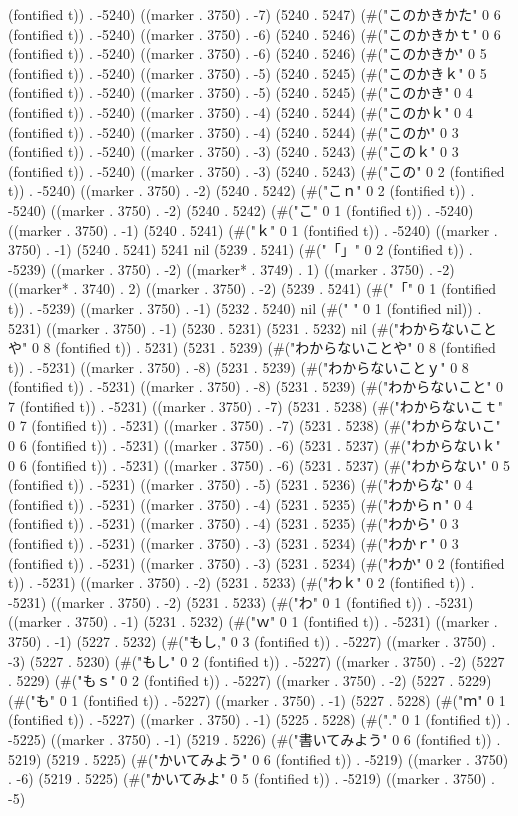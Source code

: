 {{(fontified t)) . -5240) ((marker . 3750) . -7) (5240 . 5247) (#("このかきかた" 0 6 (fontified t)) . -5240) ((marker . 3750) . -6) (5240 . 5246) (#("このかきかｔ" 0 6 (fontified t)) . -5240) ((marker . 3750) . -6) (5240 . 5246) (#("このかきか" 0 5 (fontified t)) . -5240) ((marker . 3750) . -5) (5240 . 5245) (#("このかきｋ" 0 5 (fontified t)) . -5240) ((marker . 3750) . -5) (5240 . 5245) (#("このかき" 0 4 (fontified t)) . -5240) ((marker . 3750) . -4) (5240 . 5244) (#("このかｋ" 0 4 (fontified t)) . -5240) ((marker . 3750) . -4) (5240 . 5244) (#("このか" 0 3 (fontified t)) . -5240) ((marker . 3750) . -3) (5240 . 5243) (#("このｋ" 0 3 (fontified t)) . -5240) ((marker . 3750) . -3) (5240 . 5243) (#("この" 0 2 (fontified t)) . -5240) ((marker . 3750) . -2) (5240 . 5242) (#("こｎ" 0 2 (fontified t)) . -5240) ((marker . 3750) . -2) (5240 . 5242) (#("こ" 0 1 (fontified t)) . -5240) ((marker . 3750) . -1) (5240 . 5241) (#("ｋ" 0 1 (fontified t)) . -5240) ((marker . 3750) . -1) (5240 . 5241) 5241 nil (5239 . 5241) (#("「」" 0 2 (fontified t)) . -5239) ((marker . 3750) . -2) ((marker* . 3749) . 1) ((marker . 3750) . -2) ((marker* . 3740) . 2) ((marker . 3750) . -2) (5239 . 5241) (#("「" 0 1 (fontified t)) . -5239) ((marker . 3750) . -1) (5232 . 5240) nil (#(" " 0 1 (fontified nil)) . 5231) ((marker . 3750) . -1) (5230 . 5231) (5231 . 5232) nil (#("わからないことや" 0 8 (fontified t)) . 5231) (5231 . 5239) (#("わからないことや" 0 8 (fontified t)) . -5231) ((marker . 3750) . -8) (5231 . 5239) (#("わからないことｙ" 0 8 (fontified t)) . -5231) ((marker . 3750) . -8) (5231 . 5239) (#("わからないこと" 0 7 (fontified t)) . -5231) ((marker . 3750) . -7) (5231 . 5238) (#("わからないこｔ" 0 7 (fontified t)) . -5231) ((marker . 3750) . -7) (5231 . 5238) (#("わからないこ" 0 6 (fontified t)) . -5231) ((marker . 3750) . -6) (5231 . 5237) (#("わからないｋ" 0 6 (fontified t)) . -5231) ((marker . 3750) . -6) (5231 . 5237) (#("わからない" 0 5 (fontified t)) . -5231) ((marker . 3750) . -5) (5231 . 5236) (#("わからな" 0 4 (fontified t)) . -5231) ((marker . 3750) . -4) (5231 . 5235) (#("わからｎ" 0 4 (fontified t)) . -5231) ((marker . 3750) . -4) (5231 . 5235) (#("わから" 0 3 (fontified t)) . -5231) ((marker . 3750) . -3) (5231 . 5234) (#("わかｒ" 0 3 (fontified t)) . -5231) ((marker . 3750) . -3) (5231 . 5234) (#("わか" 0 2 (fontified t)) . -5231) ((marker . 3750) . -2) (5231 . 5233) (#("わｋ" 0 2 (fontified t)) . -5231) ((marker . 3750) . -2) (5231 . 5233) (#("わ" 0 1 (fontified t)) . -5231) ((marker . 3750) . -1) (5231 . 5232) (#("ｗ" 0 1 (fontified t)) . -5231) ((marker . 3750) . -1) (5227 . 5232) (#("もし," 0 3 (fontified t)) . -5227) ((marker . 3750) . -3) (5227 . 5230) (#("もし" 0 2 (fontified t)) . -5227) ((marker . 3750) . -2) (5227 . 5229) (#("もｓ" 0 2 (fontified t)) . -5227) ((marker . 3750) . -2) (5227 . 5229) (#("も" 0 1 (fontified t)) . -5227) ((marker . 3750) . -1) (5227 . 5228) (#("ｍ" 0 1 (fontified t)) . -5227) ((marker . 3750) . -1) (5225 . 5228) (#("." 0 1 (fontified t)) . -5225) ((marker . 3750) . -1) (5219 . 5226) (#("書いてみよう" 0 6 (fontified t)) . 5219) (5219 . 5225) (#("かいてみよう" 0 6 (fontified t)) . -5219) ((marker . 3750) . -6) (5219 . 5225) (#("かいてみよ" 0 5 (fontified t)) . -5219) ((marker . 3750) . -5) }}
